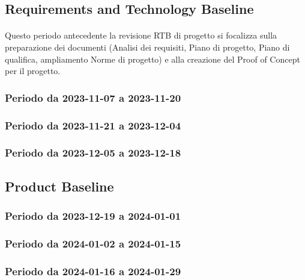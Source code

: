\documentclass[10pt, a4paper]{article}
\begin{document}
{{{{{{\subsection{Requirements and Technology Baseline}
\paragraph{}Questo periodo antecedente la revisione RTB di progetto si focalizza sulla preparazione dei documenti (Analisi dei requisiti, Piano di progetto, Piano di qualifica, ampliamento Norme di progetto) e alla creazione del Proof of Concept per il progetto.

\subsubsection{Periodo da 2023-11-07 a 2023-11-20}



\subsubsection{Periodo da 2023-11-21 a 2023-12-04}


\subsubsection{Periodo da 2023-12-05 a 2023-12-18}





\subsection{Product Baseline}



\subsubsection{Periodo da 2023-12-19 a 2024-01-01}



\subsubsection{Periodo da 2024-01-02 a 2024-01-15}



\subsubsection{Periodo da 2024-01-16 a 2024-01-29}



}}}}}}
\end{document}
